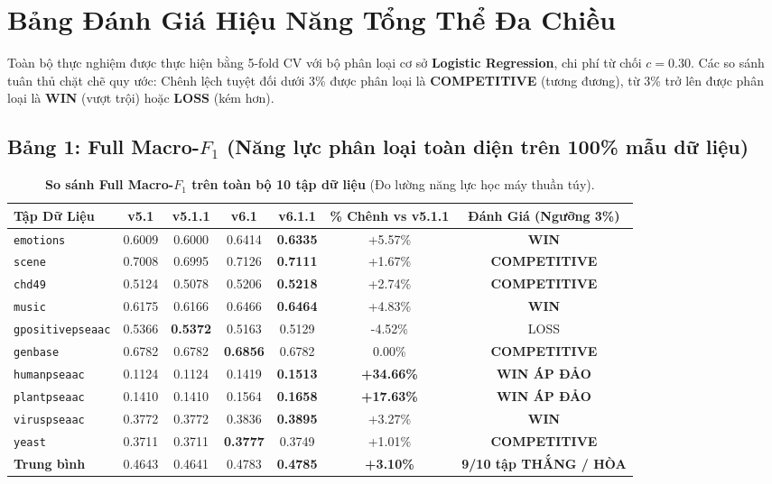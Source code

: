 \documentclass[11pt,a4paper]{article}
\begin{document}
\section{Bảng Đánh Giá Hiệu Năng Tổng Thể Đa Chiều}

Toàn bộ thực nghiệm được thực hiện bằng 5-fold CV với bộ phân loại cơ sở \textbf{Logistic Regression}, chi phí từ chối $c = 0.30$. Các so sánh tuân thủ chặt chẽ quy ước: Chênh lệch tuyệt đối dưới 3\% được phân loại là \textbf{COMPETITIVE} (tương đương), từ 3\% trở lên được phân loại là \textbf{WIN} (vượt trội) hoặc \textbf{LOSS} (kém hơn).

\subsection{Bảng 1: Full Macro-\texorpdfstring{$F_1$}{F1} (Năng lực phân loại toàn diện trên 100\% mẫu dữ liệu)}

\begin{table}[H]
\centering
\small
\caption{\textbf{So sánh Full Macro-$F_1$ trên toàn bộ 10 tập dữ liệu} (Đo lường năng lực học máy thuần túy).}
\label{tab:full_f1_benchmark}
\begin{tabular}{lcccccc}
\toprule
\textbf{Tập Dữ Liệu} & \textbf{v5.1} & \textbf{v5.1.1} & \textbf{v6.1} & \textbf{v6.1.1} & \textbf{\% Chênh vs v5.1.1} & \textbf{Đánh Giá (Ngưỡng 3\%)} \\
\midrule
\texttt{emotions} & 0.6009 & 0.6000 & 0.6414 & \textbf{0.6335} & +5.57\% & \textbf{WIN} \\
\texttt{scene} & 0.7008 & 0.6995 & 0.7126 & \textbf{0.7111} & +1.67\% & \textbf{COMPETITIVE} \\
\texttt{chd49} & 0.5124 & 0.5078 & 0.5206 & \textbf{0.5218} & +2.74\% & \textbf{COMPETITIVE} \\
\texttt{music} & 0.6175 & 0.6166 & 0.6466 & \textbf{0.6464} & +4.83\% & \textbf{WIN} \\
\texttt{gpositivepseaac} & 0.5366 & \textbf{0.5372} & 0.5163 & 0.5129 & -4.52\% & LOSS \\
\texttt{genbase} & 0.6782 & 0.6782 & \textbf{0.6856} & 0.6782 & 0.00\% & \textbf{COMPETITIVE} \\
\texttt{humanpseaac} & 0.1124 & 0.1124 & 0.1419 & \textbf{0.1513} & \textbf{+34.66\%} & \textbf{WIN ÁP ĐẢO} \\
\texttt{plantpseaac} & 0.1410 & 0.1410 & 0.1564 & \textbf{0.1658} & \textbf{+17.63\%} & \textbf{WIN ÁP ĐẢO} \\
\texttt{viruspseaac} & 0.3772 & 0.3772 & 0.3836 & \textbf{0.3895} & +3.27\% & \textbf{WIN} \\
\texttt{yeast} & 0.3711 & 0.3711 & \textbf{0.3777} & 0.3749 & +1.01\% & \textbf{COMPETITIVE} \\
\midrule
\textbf{Trung bình} & 0.4643 & 0.4641 & 0.4783 & \textbf{0.4785} & \textbf{+3.10\%} & \textbf{9/10 tập THẮNG / HÒA} \\
\bottomrule
\end{tabular}
\end{table}
\end{document}
